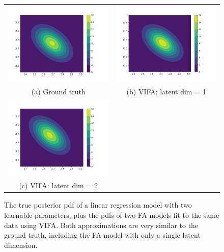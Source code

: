 \documentclass[msc,deptreport.inf]{infthesis} %
\begin{document}
\begin{figure}[!htbp] 
	\begin{tabular}{cc}
		 \includegraphics[width=70mm]{plots/linear_model_true_posterior__alpha=0.01__beta=0.1.png}
		 & \includegraphics[width=70mm]{plots/linear_model_vi_posterior__alpha=0.01__beta=0.1__latent_dim=1.png} \\
		 (a) Ground truth
		 & (b) VIFA: latent dim = 1 \\
		 \includegraphics[width=70mm]{plots/linear_model_vi_posterior__alpha=0.01__beta=0.1__latent_dim=2.png} \\
		 (c) VIFA: latent dim = 2 \\[6pt]
	\end{tabular}
	\caption{The true posterior pdf of a linear regression model with two learnable parameters, plus the pdfs of two FA models fit to the same data using VIFA. Both approximations are very similar to the ground truth, including the FA model with only a single latent dimension.}
	\label{fig:linear_regression_vi_posterior}
\end{figure}
\end{document}
